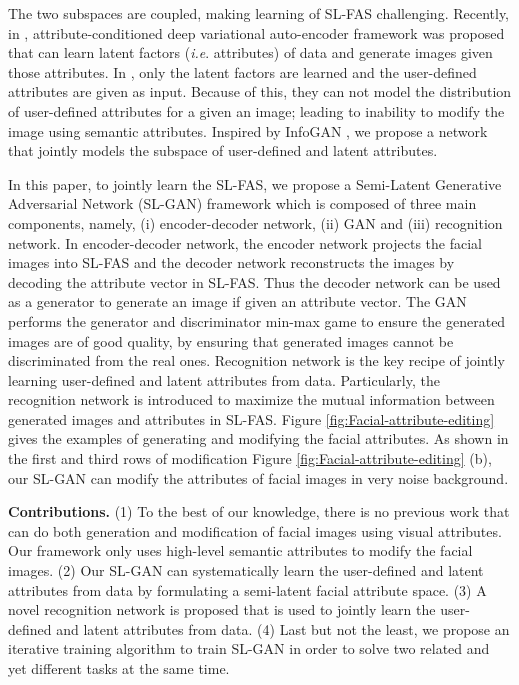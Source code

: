 \documentclass[10pt,letterpaper,twocolumn]{article}
\begin{document}
The two subspaces are coupled, making learning of SL-FAS challenging.
Recently, %
in \cite{yan2016eccv}, attribute-conditioned deep variational auto-encoder
framework was proposed that can learn latent factors (\emph{i.e}.
attributes) of data and generate images given those attributes. In
\cite{yan2016eccv}, only the latent factors are learned and the user-defined
attributes are given as input. Because of this, they can not model
the distribution of user-defined attributes for a given an image;
leading to inability to modify the image using semantic attributes.
Inspired by InfoGAN \cite{infogan}, we propose a network that jointly
models the subspace of user-defined and latent attributes.

In this paper, to jointly learn the SL-FAS, we propose a Semi-Latent
Generative Adversarial Network (SL-GAN) framework which is composed
of three main components, namely, (i) encoder-decoder network, (ii)
GAN and (iii) recognition network. In encoder-decoder network, the
encoder network projects the facial images into SL-FAS and the decoder
network reconstructs the images by decoding the attribute vector in
SL-FAS. Thus the decoder network can be used as a generator to generate
an image if given an attribute vector. The GAN performs the generator
and discriminator min-max game to ensure the generated images are
of good quality, by ensuring that generated images cannot be discriminated
from the real ones. Recognition network is the key recipe of jointly
learning user-defined and latent attributes from data. Particularly,
the recognition network is introduced to maximize the mutual information
between generated images and attributes in SL-FAS. Figure \ref{fig:Facial-attribute-editing}
gives the examples of generating and modifying the facial attributes.
As shown in the first and third rows of modification Figure \ref{fig:Facial-attribute-editing}
(b), our SL-GAN can modify the attributes of facial images in very
noise background. 

\vspace{0.07in}
\noindent \textbf{Contributions.} (1) To the best of our knowledge, there is
no previous work that can do both generation and modification of facial
images using visual attributes. Our framework only uses high-level
semantic attributes to modify the facial images. (2) Our SL-GAN can
systematically learn the user-defined and latent attributes from data
by formulating a semi-latent facial attribute space. (3) A novel recognition
network is proposed that is used to jointly learn the user-defined
and latent attributes from data. (4) Last but not the least, we propose
an iterative training algorithm to train SL-GAN in order to solve
two related and yet different tasks at the same time.
\end{document}
